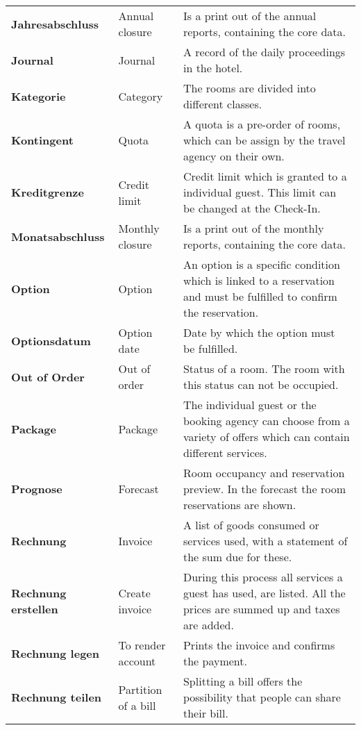 \documentclass[../Pflichtenheft.tex]{subfiles}
\begin{document}
\begin{longtable}{p{4cm} p{4cm} p{6cm}}
		\textbf{Jahresabschluss} & {Annual closure} & Is a print out of the annual reports, containing the core data. \\[0.5cm]
		\textbf{Journal} & {Journal} & A record of the daily proceedings in the hotel. \\[0.5cm]
        \textbf{Kategorie} & {Category} & The rooms are divided into different classes. \\[0.5cm]
        \textbf{Kontingent} & {Quota} & A quota is a pre-order of rooms, which can be assign by the travel agency on their own. \\[0.5cm]
        \textbf{Kreditgrenze} & {Credit limit} & Credit limit which is granted to a individual guest. This limit can be changed at the Check-In. \\[0.5cm]
        \textbf{Monatsabschluss} & {Monthly closure} & Is a print out of the monthly reports, containing the core data. \\[0.5cm]
        \textbf{Option} & {Option} & An option is a specific condition which is linked to a reservation and must be fulfilled to confirm the reservation. \\[0.5cm]
        \textbf{Optionsdatum} & {Option date} & Date by which the option must be fulfilled. \\[0.5cm]
        \textbf{Out of Order} & {Out of order} & Status of a room. The room with this status can not be occupied. \\[0.5cm]
        \textbf{Package} & {Package} & The individual guest or the booking agency can choose from a variety of offers which can contain different services. \\[0.5cm]
        \textbf{Prognose} & {Forecast} & Room occupancy and reservation preview. In the forecast the room reservations are shown. \\[0.5cm]
        \textbf{Rechnung} & {Invoice} & A list of goods consumed or services used, with a statement of the sum due for these. \\[0.5cm]
        \textbf{Rechnung erstellen} & {Create invoice} & During this process all services a guest has used, are listed. All the prices are summed up and taxes are added. \\[0.5cm]
        \textbf{Rechnung legen} & {To render account} & Prints the invoice and confirms the payment. \\[0.5cm]
        \textbf{Rechnung teilen} & {Partition of a bill} & Splitting a bill offers the possibility that people can share their bill. \\[0.5cm]

\end{longtable}
\end{document}
